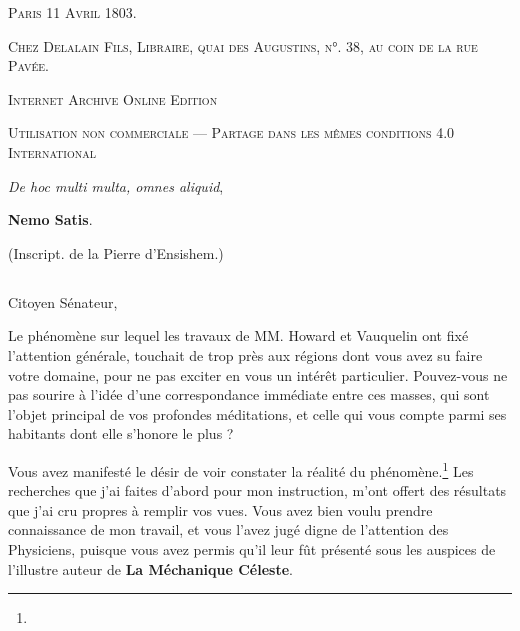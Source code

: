 \documentclass[a4paper, 11pt, oneside, polutonikogreek, french]{article}
\begin{document}
\begin{titlepage}
        \vspace*{\fill}

	\vspace{1\baselineskip}

	{\small\scshape Paris 11 Avril 1803.}
	
	{\small\scshape{Chez Delalain Fils, Libraire, quai des Augustins, n°. 38, au coin de la rue Pavée.}}
	
	\vspace{0.5\baselineskip} %

        \scshape Internet Archive Online Edition  %
	
	{\scshape\small Utilisation non commerciale --- Partage dans les mêmes conditions 4.0 International} %
\end{titlepage}
\setlength{\parskip}{1mm plus1mm minus1mm}
\clearpage
\Large
\pagestyle{fancy}
\fancyhf{}
\cfoot{\Fontauri{\thepage}}
\vspace*{\fill}
\begin{center}
{\Large \emph{De hoc multi multa, omnes aliquid},}

\textbf{Nemo Satis}.

(Inscript. de la Pierre d'Ensishem.)
\end{center}
\vspace*{\fill}
\clearpage
\tableofcontents
\clearpage
\subsection*{}
\paragraph{}
Citoyen Sénateur,

Le phénomène sur lequel les travaux de MM. Howard et Vauquelin ont fixé l'attention générale, touchait de trop près aux régions dont vous avez su faire votre domaine, pour ne pas exciter en vous un intérêt particulier. Pouvez-vous ne pas sourire à l'idée d'une correspondance immédiate entre ces masses, qui sont l'objet principal de vos profondes méditations, et celle qui vous compte parmi ses habitants dont elle s'honore le plus ?

Vous avez manifesté le désir de voir constater la réalité du phénomène.\footnote{} Les recherches que j'ai faites d'abord pour mon instruction, m'ont offert des résultats que j'ai cru propres à remplir vos vues. Vous avez bien voulu prendre connaissance de mon travail, et vous l'avez jugé digne de l'attention des Physiciens, puisque vous avez permis qu'il leur fût présenté sous les auspices de l'illustre auteur de \textbf{La Méchanique Céleste}.
\end{document}
